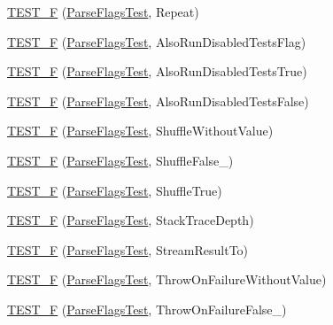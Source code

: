 \begin{DoxyCompactItemize}
\item 
\mbox{\hyperlink{namespacetesting_aad196be6244a5fd202ea05c8c409b0d1}{T\+E\+S\+T\+\_\+F}} (\mbox{\hyperlink{classtesting_1_1ParseFlagsTest}{Parse\+Flags\+Test}}, Repeat)
\item 
\mbox{\hyperlink{namespacetesting_a579ed858a912b7fd5ff7b68f3c0d9184}{T\+E\+S\+T\+\_\+F}} (\mbox{\hyperlink{classtesting_1_1ParseFlagsTest}{Parse\+Flags\+Test}}, Also\+Run\+Disabled\+Tests\+Flag)
\item 
\mbox{\hyperlink{namespacetesting_accb8f0a859dab6088b9429bf6fb3e1ac}{T\+E\+S\+T\+\_\+F}} (\mbox{\hyperlink{classtesting_1_1ParseFlagsTest}{Parse\+Flags\+Test}}, Also\+Run\+Disabled\+Tests\+True)
\item 
\mbox{\hyperlink{namespacetesting_afde27ba975e4a485af64de4c37dcbb98}{T\+E\+S\+T\+\_\+F}} (\mbox{\hyperlink{classtesting_1_1ParseFlagsTest}{Parse\+Flags\+Test}}, Also\+Run\+Disabled\+Tests\+False)
\item 
\mbox{\hyperlink{namespacetesting_a23373676b5605f4446444568b03851c1}{T\+E\+S\+T\+\_\+F}} (\mbox{\hyperlink{classtesting_1_1ParseFlagsTest}{Parse\+Flags\+Test}}, Shuffle\+Without\+Value)
\item 
\mbox{\hyperlink{namespacetesting_ac510159c0bac8ecf77e0d3884569b314}{T\+E\+S\+T\+\_\+F}} (\mbox{\hyperlink{classtesting_1_1ParseFlagsTest}{Parse\+Flags\+Test}}, Shuffle\+False\+\_)
\item 
\mbox{\hyperlink{namespacetesting_a11ba77d82075e6b72cc2cc3a0568eb4b}{T\+E\+S\+T\+\_\+F}} (\mbox{\hyperlink{classtesting_1_1ParseFlagsTest}{Parse\+Flags\+Test}}, Shuffle\+True)
\item 
\mbox{\hyperlink{namespacetesting_a1061c3a0db32c0706e9beba39c4d4324}{T\+E\+S\+T\+\_\+F}} (\mbox{\hyperlink{classtesting_1_1ParseFlagsTest}{Parse\+Flags\+Test}}, Stack\+Trace\+Depth)
\item 
\mbox{\hyperlink{namespacetesting_aa4c92d2a72b78b58c0bf7f59fc2be6d6}{T\+E\+S\+T\+\_\+F}} (\mbox{\hyperlink{classtesting_1_1ParseFlagsTest}{Parse\+Flags\+Test}}, Stream\+Result\+To)
\item 
\mbox{\hyperlink{namespacetesting_a1b96e71b9d6bde57bb5f7536961b5076}{T\+E\+S\+T\+\_\+F}} (\mbox{\hyperlink{classtesting_1_1ParseFlagsTest}{Parse\+Flags\+Test}}, Throw\+On\+Failure\+Without\+Value)
\item 
\mbox{\hyperlink{namespacetesting_a1b5b5c2e1f15ff13cad4ac7d5415f271}{T\+E\+S\+T\+\_\+F}} (\mbox{\hyperlink{classtesting_1_1ParseFlagsTest}{Parse\+Flags\+Test}}, Throw\+On\+Failure\+False\+\_)
\item 

\end{DoxyCompactItemize}

